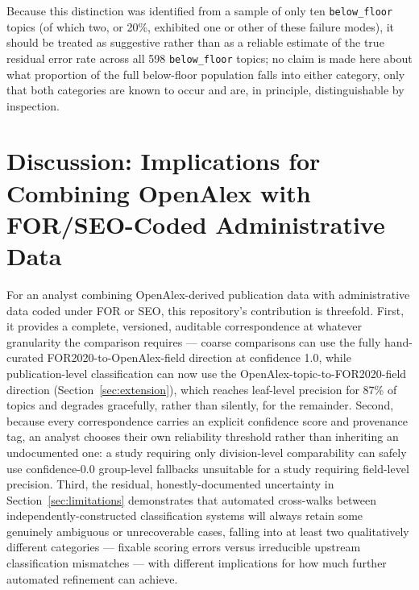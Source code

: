\documentclass[11pt]{article}
\begin{document}
Because this distinction was identified from a sample of only ten \texttt{below\_floor}
topics (of which two, or 20\%, exhibited one or other of these failure modes), it should
be treated as suggestive rather than as a reliable estimate of the true residual error
rate across all 598 \texttt{below\_floor} topics; no claim is made here about what
proportion of the full below-floor population falls into either category, only that both
categories are known to occur and are, in principle, distinguishable by inspection.

\section{Discussion: Implications for Combining OpenAlex with FOR/SEO-Coded
Administrative Data}
\label{sec:discussion}

For an analyst combining OpenAlex-derived publication data with administrative data
coded under FOR or SEO, this repository's contribution is threefold. First, it provides
a complete, versioned, auditable correspondence at whatever granularity the comparison
requires --- coarse comparisons can use the fully hand-curated
FOR2020-to-OpenAlex-field direction at confidence 1.0, while publication-level
classification can now use the OpenAlex-topic-to-FOR2020-field direction
(Section~\ref{sec:extension}), which reaches leaf-level precision for 87\% of topics and
degrades gracefully, rather than silently, for the remainder. Second, because every
correspondence carries an explicit confidence score and provenance tag, an analyst
chooses their own reliability threshold rather than inheriting an undocumented one: a
study requiring only division-level comparability can safely use confidence-0.0
group-level fallbacks unsuitable for a study requiring field-level precision. Third, the
residual, honestly-documented uncertainty in Section~\ref{sec:limitations} demonstrates
that automated cross-walks between independently-constructed classification systems
will always retain some genuinely ambiguous or unrecoverable cases, falling into at
least two qualitatively different categories --- fixable scoring errors versus
irreducible upstream classification mismatches --- with different implications for how
much further automated refinement can achieve.
\end{document}
